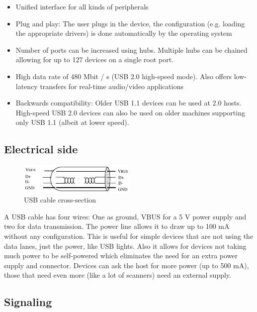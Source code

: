 \documentclass{article}
\begin{document}
\begin{itemize}
  \item Unified interface for all kinds of peripherals
  \item Plug and play: The user plugs in the device, the configuration (e.g. loading the appropriate drivers)
  is done automatically by the operating system
  \item Number of ports can be increased using hubs. Multiple hubs can be chained
        allowing for up to 127 devices on a single root port.
  \item High data rate of 480 Mbit / s (USB 2.0 high-speed mode). Also offers low-latency
        transfers for real-time audio/video applications
  \item Backwards compatibility: Older USB 1.1 devices can be used at 2.0 hosts.
        High-speed USB 2.0 devices can also be used on older
        machines supporting only USB 1.1 (albeit at lower speed).
\end{itemize}

\subsection{Electrical side}

\begin{figure}[!htbp]
  \caption{USB cable cross-section \cite[p. 17]{usbstd}}
  \centering
  \includegraphics[width=0.5\textwidth]{images/usb_cable.jpg}
\end{figure}

A USB cable has four wires: One as ground, VBUS for a 5 V power supply and two for data transmission.
The power line allows it to draw up to 100 mA without any configuration. This is useful for simple
devices that are not using the data lanes, just the power, like USB lights. Also it allows for devices
not taking much power to be self-powered which eliminates the need for an extra power supply and connector.
Devices can ask the host for more power (up to 500 mA), those that need even more (like a lot of scanners) need
an external supply. \cite[p. 17f.]{usbstd}

\subsection{Signaling}
\end{document}
